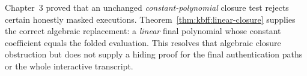 \begin{remark}
Chapter~3 proved that an unchanged \emph{constant-polynomial} closure test rejects certain honestly masked executions. Theorem~\ref{thm:kbff:linear-closure} supplies the correct algebraic replacement: a \emph{linear} final polynomial whose constant coefficient equals the folded evaluation. This resolves that algebraic closure obstruction but does not supply a hiding proof for the final authentication paths or the whole interactive transcript.
\end{remark}
